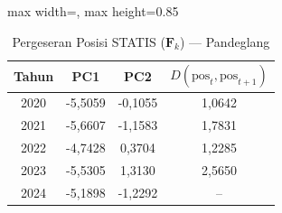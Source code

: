\begin{table}[H]
\centering
\caption{Pergeseran Posisi STATIS ($\mathbf{F}_k$) --- Pandeglang} \label{tab:app1jarak_statis_skor_pandeglang}
\begin{adjustbox}{max width=\textwidth, max height=0.85\textheight}
\begin{tabular}{|c|c|c|c|}
\hline
\textbf{Tahun} & \textbf{PC1} & \textbf{PC2} & \textbf{$D(\text{pos}_t, \text{pos}_{t+1})$} \\
\hline
2020 & -5,5059 & -0,1055 & 1,0642 \\
2021 & -5,6607 & -1,1583 & 1,7831 \\
2022 & -4,7428 & 0,3704 & 1,2285 \\
2023 & -5,5305 & 1,3130 & 2,5650 \\
2024 & -5,1898 & -1,2292 & -- \\
\hline
\end{tabular}
\end{adjustbox}
\end{table}